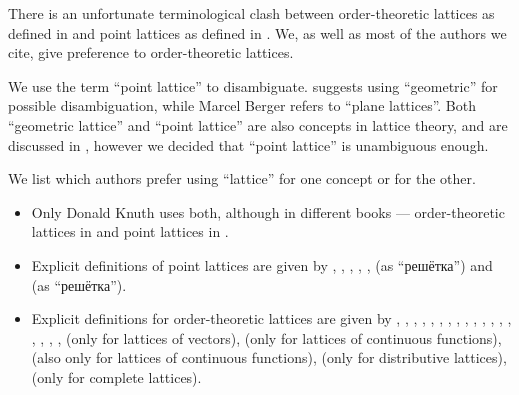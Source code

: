 \begin{remark}\label{rem:lattice_terminology}
  There is an unfortunate terminological clash between order-theoretic lattices as defined in  and point lattices as defined in . We, as well as most of the authors we cite, give preference to order-theoretic lattices.

  We use the term \enquote{point lattice} to disambiguate.  suggests using \enquote{geometric} for possible disambiguation, while Marcel Berger refers to \enquote{plane lattices}. Both \enquote{geometric lattice} and \enquote{point lattice} are also concepts in lattice theory, and are discussed in \cite[80]{Birkhoff1967Lattices}, however we decided that \enquote{point lattice} is unambiguous enough.

  We list which authors prefer using \enquote{lattice} for one concept or for the other.
  \begin{itemize}
    \item Only Donald Knuth uses both, although in different books --- order-theoretic lattices in \cite[exerc. 2.3.2.19]{Knuth1997ArtVol2} and point lattices in \cite[97]{Knuth1997ArtVol2}.

    \item Explicit definitions of point lattices are given by
    ,
    ,
    ,
    ,
    ,
     (as \enquote{решётка}) and
     (as \enquote{решётка}).

    \item Explicit definitions for order-theoretic lattices are given by
    ,
    ,
    ,
    ,
    ,
    ,
    ,
    ,
    ,
    ,
    ,
    ,
    ,
    ,
    ,
    ,
    ,
    ,
     (only for lattices of vectors),
     (only for lattices of continuous functions),
     (also only for lattices of continuous functions),
     (only for distributive lattices),
     (only for complete lattices).


\end{itemize}
\end{remark}
